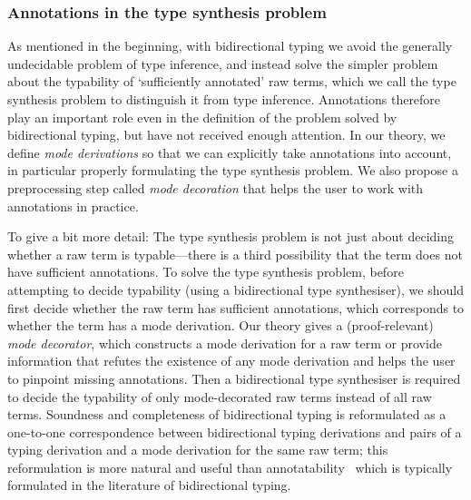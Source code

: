 \subsubsection{Annotations in the type synthesis problem}

As mentioned in the beginning, with bidirectional typing we avoid the generally undecidable problem of type inference, and instead solve the simpler problem about the typability of `sufficiently annotated' raw terms, which we call the type synthesis problem to distinguish it from type inference.
Annotations therefore play an important role even in the definition of the problem solved by bidirectional typing, but have not received enough attention.
In our theory, we define \emph{mode derivations} so that we can explicitly take annotations into account, in particular properly formulating the type synthesis problem.
We also propose a preprocessing step called \emph{mode decoration} that helps the user to work with annotations in practice.

To give a bit more detail:
The type synthesis problem is not just about deciding whether a raw term is typable---there is a third possibility that the term does not have sufficient annotations.
To solve the type synthesis problem, before attempting to decide typability (using a bidirectional type synthesiser), we should first decide whether the raw term has sufficient annotations, which corresponds to whether the term has a mode derivation.
Our theory gives a (proof-relevant) \emph{mode decorator}, which constructs a mode derivation for a raw term or provide information that refutes the existence of any mode derivation and helps the user to pinpoint missing annotations.
Then a bidirectional type synthesiser is required to decide the typability of only mode-decorated raw terms instead of all raw terms.
Soundness and completeness of bidirectional typing is reformulated as a one-to-one correspondence between bidirectional typing derivations and pairs of a typing derivation and a mode derivation for the same raw term; this reformulation is more natural and useful than annotatability~\cite[Section~3.2]{Dunfield2021} which is typically formulated in the literature of bidirectional typing.



